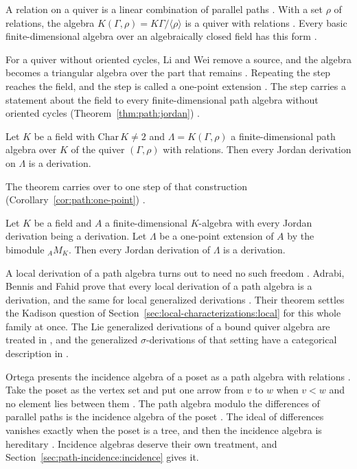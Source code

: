A relation on a quiver is a linear combination of parallel paths
\cite[p.~81]{LiWei2018}. With a set $\rho$ of relations, the algebra
$K(\Gamma,\rho)=K\Gamma/\langle\rho\rangle$ is a quiver with relations
\cite[p.~81]{LiWei2018}. Every basic finite-dimensional algebra over an
algebraically closed field has this form \cite[p.~81]{LiWei2018}.

For a quiver without oriented cycles, Li and Wei remove a source, and the algebra
becomes a triangular algebra over the part that remains
\cite[p.~83]{LiWei2018}. Repeating the step reaches the field, and the step is
called a one-point extension \cite[p.~83]{LiWei2018}. The step carries a statement
about the field to every finite-dimensional path algebra without oriented cycles (Theorem~\ref{thm:path:jordan})
\cite[p.~85]{LiWei2018}.\begin{theorem}\label{thm:path:jordan}
Let $K$ be a field with $\mathrm{Char}\,K\neq 2$ and $\Lambda=K(\Gamma,\rho)$ a
finite-dimensional path algebra over $K$ of the quiver $(\Gamma,\rho)$ with
relations. Then every Jordan derivation on $\Lambda$ is a derivation.
\end{theorem}

The theorem carries over to one step of that construction (Corollary~\ref{cor:path:one-point})
\cite[p.~86]{LiWei2018}.\begin{corollary}\label{cor:path:one-point}
Let $K$ be a field and $A$ a finite-dimensional $K$-algebra with every Jordan
derivation being a derivation. Let $\Lambda$ be a one-point extension of $A$ by the
bimodule $_{A}M_{K}$. Then every Jordan derivation of $\Lambda$ is a derivation.
\end{corollary}

A local derivation of a path algebra turns out to need no such freedom
\cite[Theorem~3, p.~391]{AdrabiBennisFahid2023Local}.
Adrabi, Bennis and Fahid prove that every local derivation of a path algebra
is a derivation, and the same for local generalized derivations
\cite[Theorem~3, p.~391]{AdrabiBennisFahid2023Local}. Their theorem settles
the Kadison question of Section~\ref{sec:local-characterizations:local} for
this whole family at once. The Lie generalized derivations of a bound quiver
algebra are treated in \cite[p.~1950]{AdrabiBennisFahid2021Lie}, and the
generalized $\sigma$-derivations of that setting have a categorical
description in \cite[p.~4754]{AdrabiBennisFahid2023Categorical}.

Ortega presents the incidence algebra of a poset as a path algebra with
relations \cite[p.~232]{Ortega2006}. Take the poset as the vertex set and put
one arrow from $v$ to $w$ when $v<w$ and no element lies between them
\cite[p.~232]{Ortega2006}. The path algebra modulo the differences of parallel
paths is the incidence algebra of the poset \cite[p.~232]{Ortega2006}. The
ideal of differences vanishes exactly when the poset is a tree, and then the
incidence algebra is hereditary \cite[p.~232]{Ortega2006}. Incidence algebras
deserve their own treatment, and Section~\ref{sec:path-incidence:incidence}
gives it.

